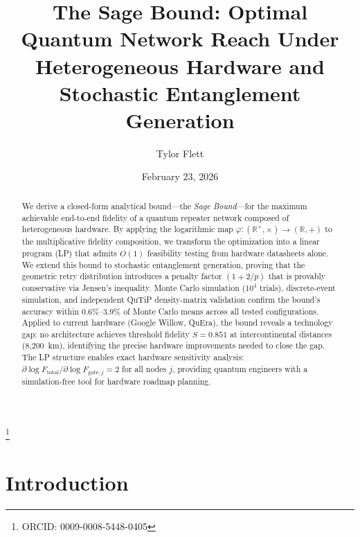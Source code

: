 \documentclass[aps,pra,reprint,amsmath,amssymb,superscriptaddress]{revtex4-2}
\begin{document}
\title{The Sage Bound: Optimal Quantum Network Reach Under\\
Heterogeneous Hardware and Stochastic Entanglement Generation}

\author{Tylor Flett}
\thanks{ORCID: 0009-0008-5448-0405}

\date{February 23, 2026}

\begin{abstract}
We derive a closed-form analytical bound---the \emph{Sage Bound}---for the maximum achievable end-to-end fidelity of a quantum repeater network composed of heterogeneous hardware. By applying the logarithmic map $\varphi: (\mathbb{R}^+, \times) \to (\mathbb{R}, +)$ to the multiplicative fidelity composition, we transform the optimization into a linear program (LP) that admits $O(1)$ feasibility testing from hardware datasheets alone. We extend this bound to stochastic entanglement generation, proving that the geometric retry distribution introduces a penalty factor $(1 + 2/p)$ that is provably conservative via Jensen's inequality. Monte Carlo simulation ($10^4$ trials), discrete-event simulation, and independent QuTiP density-matrix validation confirm the bound's accuracy within $0.6\%$--$3.9\%$ of Monte Carlo means across all tested configurations. Applied to current hardware (Google Willow, QuEra), the bound reveals a technology gap: no architecture achieves threshold fidelity $S = 0.851$ at intercontinental distances (8{,}200~km), identifying the precise hardware improvements needed to close the gap. The LP structure enables exact hardware sensitivity analysis: $\partial \log F_{\text{total}} / \partial \log F_{\text{gate},j} = 2$ for all nodes $j$, providing quantum engineers with a simulation-free tool for hardware roadmap planning.
\end{abstract}

\maketitle


\section{Introduction}
\end{document}
